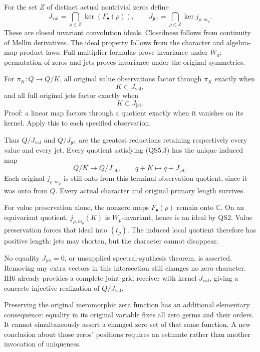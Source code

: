 For the set \(Z\) of distinct actual nontrivial zeros define \[
J_{\mathrm{val}}=\bigcap_{\rho\in Z}\ker(F_\bullet(\rho)),\qquad
J_{\mathrm{jet}}=\bigcap_{\rho\in Z}\ker j_{\rho,m_\rho}.
\tag{QS5.1}
\] These are closed invariant convolution ideals. Closedness follows
from continuity of Mellin derivatives. The ideal property follows from
the character and algebra-map product laws. Full multiplier formulas
prove invariance under \(W_a\); permutation of zeros and jets proves
invariance under the original symmetries.

For \(\pi_K:Q\to Q/K\), all original value observations factor through
\(\pi_K\) exactly when \[
K\subset J_{\mathrm{val}},
\tag{QS5.2}
\] and all full original jets factor exactly when \[
K\subset J_{\mathrm{jet}}.
\tag{QS5.3}
\] Proof: a linear map factors through a quotient exactly when it
vanishes on its kernel. Apply this to each specified observation.

Thus \(Q/J_{\mathrm{val}}\) and \(Q/J_{\mathrm{jet}}\) are the greatest
reductions retaining respectively every value and every jet. Every
quotient satisfying (QS5.3) has the unique induced map \[
Q/K\longrightarrow Q/J_{\mathrm{jet}},\qquad
q+K\longmapsto q+J_{\mathrm{jet}}.
\tag{QS5.4}
\] Each original \(j_{\rho,m_\rho}\) is still onto from this terminal
observation quotient, since it was onto from \(Q\). Every actual
character and original primary length survives.

For value preservation alone, the nonzero maps \(F_\bullet(\rho)\)
remain onto \(\mathbb C\). On an equivariant quotient,
\(j_{\rho,m_\rho}(K)\) is \(W_p\)-invariant, hence is an ideal by QS2.
Value preservation forces that ideal into \((t_\rho)\). The induced
local quotient therefore has positive length: jets may shorten, but the
character cannot disappear.

No equality \(J_{\mathrm{jet}}=0\), or unsupplied spectral-synthesis
theorem, is asserted. Removing any extra vectors in this intersection
still changes no zero character. IH6 already provides a complete
joint-grid receiver with kernel \(J_{\mathrm{val}}\), giving a concrete
injective realization of \(Q/J_{\mathrm{val}}\).

Preserving the original meromorphic zeta function has an additional
elementary consequence: equality in its original variable fixes all zero
germs and their orders. It cannot simultaneously assert a changed zero
set of that same function. A new conclusion about those zeros' positions
requires an estimate rather than another invocation of uniqueness.

